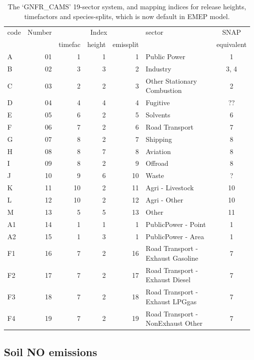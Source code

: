 \begin{table}
\caption{The `GNFR\_CAMS' 19-sector system, and mapping indices for release heights, timefactors and species-splits,
 which is now
 default in EMEP model. \label{tab:GNFRsectors}
}
\begin{tabular}{lrrrrlc}
\hline
code & Number  & \multicolumn{3}{c}{Index}      & sector & SNAP \\ \cline{3-5}
     &         & timefac  & height & emissplit  &        & equivalent \\
\hline
A &      01 &   1 &  1 &   1 &  Public Power  &  1 \\
B &      02 &   3 &  3 &   2 &  Industry  & 3, 4 \\
C &      03 &   2 &  2 &   3 &  Other Stationary Combustion & 2 \\
D &      04 &   4 &  4 &   4 &  Fugitive & ??  \\
E &      05 &   6 &  2 &   5 &  Solvents & 6 \\
F &      06 &   7 &  2 &   6 &  Road Transport & 7 \\
G &      07 &   8 &  2 &   7 &  Shipping & 8  \\
H &      08 &   8 &  7 &   8 &  Aviation & 8  \\
I &      09 &   8 &  2 &   9 &  Offroad & 8  \\
J &     10 &   9 &  6 &  10 &  Waste & ? \\
K &     11 &  10 &  2 &  11 &  Agri - Livestock & 10 \\
L &     12 &  10 &  2 &  12 &  Agri - Other & 10 \\
M &     13 &   5 &  5 &  13 &  Other & 11 \\
A1 &    14 &   1 &  1 &   1 &  PublicPower - Point & 1 \\
A2 &    15 &   1 &  3 &   1 &  PublicPower - Area & 1 \\
F1 &    16 &   7 &  2 &  16 &  Road Transport - Exhaust Gasoline & 7  \\
F2 &    17 &   7 &  2 &  17 &  Road Transport - Exhaust Diesel& 7   \\
F3 &    18 &   7 &  2 &  18 &  Road Transport - Exhaust LPGgas & 7  \\
F4 &    19 &   7 &  2 &  19 &  Road Transport - NonExhaust Other& 7   \\
\hline
\end{tabular}
\end{table}

\clearpage


\subsection{Soil NO emissions}
\label{ssec:soilNO}

